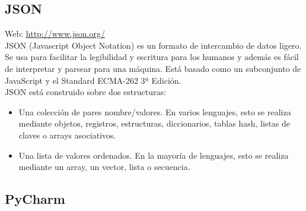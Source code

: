 \subsection{JSON}

Web: \url{http://www.json.org/}\\

JSON (Javascript Object Notation) es un formato de intercambio de datos ligero. Se usa para facilitar la legibilidad y escritura para los humanos y además es fácil de interpretar y parsear para una máquina. Está basado como un subconjunto de JavaScript y el Standard ECMA-262 3ª Edición. \\

JSON está construido sobre dos estructuras:

\begin{itemize}
\item Una colección de pares nombre/valores. En varios lenguajes, esto se realiza mediante objetos, registros, estructuras, diccionarios, tablas hash, listas de claves o arrays asociativos.
\item Una lista de valores ordenados. En la mayoría de lenguajes, esto se realiza mediante un array, un vector, lista o secuencia.
\end{itemize}

\subsection{PyCharm}


